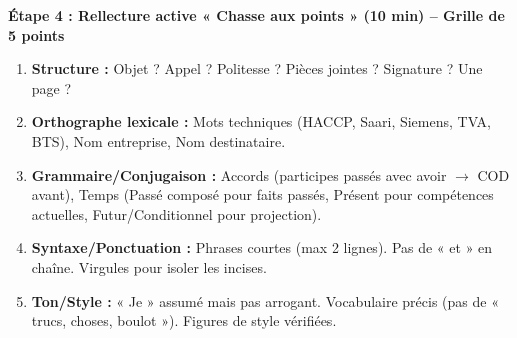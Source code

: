 \documentclass[11pt]{article}
\begin{document}
\begin{methode}
\textbf{Étape 4 : Rellecture active « Chasse aux points » (10 min) -- \textbf{Grille de 5 points}}
\begin{enumerate}
\item \textbf{Structure :} Objet ? Appel ? Politesse ? Pièces jointes ? Signature ? Une page ?
\item \textbf{Orthographe lexicale :} Mots techniques (HACCP, Saari, Siemens, TVA, BTS), Nom entreprise, Nom destinataire.
\item \textbf{Grammaire/Conjugaison :} Accords (participes passés avec avoir $\rightarrow$ COD avant), Temps (Passé composé pour faits passés, Présent pour compétences actuelles, Futur/Conditionnel pour projection).
\item \textbf{Syntaxe/Ponctuation :} Phrases courtes (max 2 lignes). Pas de « et » en chaîne. Virgules pour isoler les incises.
\item \textbf{Ton/Style :} « Je » assumé mais pas arrogant. Vocabulaire précis (pas de « trucs, choses, boulot »). Figures de style vérifiées.
\end{enumerate}
\end{methode}
\end{document}
